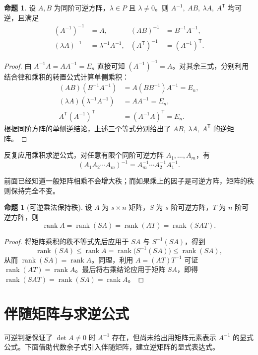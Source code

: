 \documentclass[UTF8, fontset=fandol, a4paper, 12pt]{ctexart}
\newcommand{\rank}{\operatorname{rank}}
\theoremstyle{definition}
\newtheorem{proposition}[definition]{命题}
\begin{document}
\begin{proposition}\label{prop:inverse-laws}
设 $A,B$ 为同阶可逆方阵，$\lambda\in P$ 且 $\lambda\ne0$。则 $A^{-1},\ AB,\ \lambda A,\ A^{\mathsf T}$ 均可逆，且满足
\[
 \begin{aligned}
  (A^{-1})^{-1}&=A, & (AB)^{-1}&=B^{-1}A^{-1},\\
  (\lambda A)^{-1}&=\lambda^{-1}A^{-1}, & (A^{\mathsf T})^{-1}&=(A^{-1})^{\mathsf T}.
 \end{aligned}
\]
\end{proposition}
\begin{proof}
由 $A^{-1}A=AA^{-1}=E_n$ 直接可知 $(A^{-1})^{-1}=A$。对其余三式，分别利用结合律和乘积的转置公式计算单侧乘积：
\[
 \begin{aligned}
  (AB)(B^{-1}A^{-1})&=A(BB^{-1})A^{-1}=E_n,\\
  (\lambda A)(\lambda^{-1}A^{-1})&=AA^{-1}=E_n,\\
  A^{\mathsf T}(A^{-1})^{\mathsf T}&=(A^{-1}A)^{\mathsf T}=E_n.
 \end{aligned}
\]
根据同阶方阵的单侧逆结论，上述三个等式分别给出了 $AB,\ \lambda A,\ A^{\mathsf T}$ 的逆矩阵。
\end{proof}

反复应用乘积求逆公式，对任意有限个同阶可逆方阵 $A_1,\ldots,A_m$，有
\[
 (A_1A_2\cdots A_m)^{-1}=A_m^{-1}\cdots A_2^{-1}A_1^{-1}.
\]

前面已经知道一般矩阵相乘不会增大秩；而如果乘上的因子是可逆方阵，矩阵的秩则保持完全不变。

\begin{proposition}[可逆乘法保持秩]
设 $A$ 为 $s\times n$ 矩阵，$S$ 为 $s$ 阶可逆方阵，$T$ 为 $n$ 阶可逆方阵，则
\[
 \rank A=\rank(SA)=\rank(AT)=\rank(SAT).
\]
\end{proposition}
\begin{proof}
将矩阵乘积的秩不等式先后应用于 $SA$ 与 $S^{-1}(SA)$，得到
\[
 \rank(SA)\le\rank A=\rank\bigl(S^{-1}(SA)\bigr)\le\rank(SA),
\]
从而 $\rank(SA)=\rank A$。同理，利用 $A=(AT)T^{-1}$ 可证 $\rank(AT)=\rank A$。最后将右乘结论应用于矩阵 $SA$，即得 $\rank(SAT)=\rank(SA)=\rank A$。
\end{proof}

\section{伴随矩阵与求逆公式}

可逆判据保证了 $\det A\ne0$ 时 $A^{-1}$ 存在，但尚未给出用矩阵元素表示 $A^{-1}$ 的显式公式。下面借助代数余子式引入伴随矩阵，建立逆矩阵的显式表达式。
\end{document}
